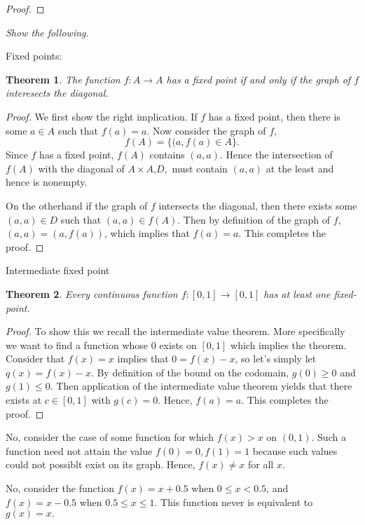 \documentclass[letter]{article}
\newtheorem{theorem}{Theorem}
\newenvironment{menumerate}{%
  \edef\backupindent{\the\parindent}%
  \enumerate%
  \setlength{\parindent}{\backupindent}%
}{\endenumerate}
\begin{document}
\begin{menumerate}
\begin{proof}
		\end{proof}

	\setcounter{enumi}{21}
	\item \textit{Show the following.} 
		\begin{menumerate}
			\item Fixed points: \begin{theorem}
				The function $f: A \to A$ has a fixed point if and only if the graph of $f$ interesects the diagonal.
			\end{theorem}
			\begin{proof}
				We first show the right implication. If $f$ has a fixed point, then there is some $a \in A$ such that $f(a) = a$. Now consider the graph of $f$, 
				$$f(A) = \{(a, f(a) \in A\}.$$ 
				Since $f$ has a fixed point, $f(A)$ contains $(a,a).$ Hence the intersection of $f(A)$ with the diagonal of $A\times A$,$D,$ must contain $(a,a)$ at the least and hence is nonempty.

				On the otherhand if the graph of $f$ intersects the diagonal, then there exists some $(a,a) \in D$ such that $(a,a) \in f(A).$ Then by definition of the graph of $f$, $(a,a) = (a,f(a))$, which implies that $f(a) = a.$ This completes the proof.
			\end{proof}


			\item Intermediate fixed point
			\begin{theorem}
				Every continuous function $f: [0,1] \to [0,1]$ has at least one fixed-point.
			\end{theorem}
			\begin{proof}
				To show this we recall the intermediate value theorem. More specifically we want to find a function whose $0$ exists on $[0,1]$ which implies the theorem. Consider that $f(x) =x$ implies that $0 = f(x) - x$, so let's simply let $q(x) = f(x) - x$. By definition of the bound on the codomain, $g(0) \geq 0$ and $g(1) \leq 0$. Then application of the intermediate value theorem yields that there exists at $c \in [0,1]$ with $g(c) = 0.$ Hence, $f(a) = a$. This completes the proof.
			\end{proof}
			\item No, consider the case of some function for which $f(x) > x$ on $(0,1)$. Such a function need not attain the value $f(0) = 0, f(1) = 1$ because such values could not possiblt exist on its graph. Hence, $f(x) \neq x$ for all $x$. 
			\item No, consider the function $f(x) = x+0.5$ when $0\leq x < 0.5$, and $f(x) = x-0.5$ when $0.5 \leq x \leq 1$. This function never is equivalent to $g(x) = x.$
		\end{menumerate}


\end{menumerate}
\end{document}
